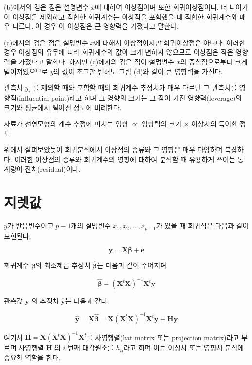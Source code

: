 \documentclass[
  10pt,
]{book}
\makeatletter
\newenvironment{kframe}{%
\medskip{}
\setlength{\fboxsep}{.8em}
 \def\at@end@of@kframe{}%
 \ifinner\ifhmode%
  \def\at@end@of@kframe{\end{minipage}}%
  \begin{minipage}{\columnwidth}%
 \fi\fi%
 \def\FrameCommand##1{\hskip\@totalleftmargin \hskip-\fboxsep
 \colorbox{shadecolor}{##1}\hskip-\fboxsep
     \hskip-\linewidth \hskip-\@totalleftmargin \hskip\columnwidth}%
 \MakeFramed {\advance\hsize-\width
   \@totalleftmargin\z@ \linewidth\hsize
   \@setminipage}}%
 {\par\unskip\endMakeFramed%
 \at@end@of@kframe}
\newenvironment{rmdblock}[1]
  {
  \begin{itemize}
  \renewcommand{\labelitemi}{
    \raisebox{-.7\height}[0pt][0pt]{
      {\setkeys{Gin}{width=3em,keepaspectratio}\texttt{[image: images/\#1]}}
    }
  }
  \setlength{\fboxsep}{1em}
  \begin{kframe}
  \item
  }
  {
  \end{kframe}
  \end{itemize}
  }
\newenvironment{rmdimportant}
  {\begin{rmdblock}{important}}
  {\end{rmdblock}}
\theoremstyle{definition}
\theoremstyle{definition}
\theoremstyle{definition}
\theoremstyle{definition}
\theoremstyle{remark}
\makeatother
\begin{document}
(b)에서의 검은 점은 설명변수 \(x\)에 대하여 이상점이며 또한
회귀이상점이다. 더 나아가 이 이상점을 제외하고 적합한 회귀계수는
이상점을 포함했을 때 적합한 회귀계수와 매우 다르다. 이 경우 이 이상점은
큰 영향력을 가졌다고 말한다.

(c)에서의 검은 점은 설명변수 \(x\)에 대해서 이상점이지만 회귀이상점은
아니다. 이러한 경우 이상점의 유무에 따라 회귀계수의 값이 크게 변하지
않으므로 이상점은 작은 영향력을 가졌다고 말한다. 하지만 (c)에서의 검은
점이 설명변수 \(x\)의 중심점으로부터 크게 멀어져있으므로 \(y\)의 값이 조그만
변해도 그림 (d)와 같이 큰 영향력을 가진다.

관측치 \(y_i\) 를 제외할 때와 포함할 때의 회귀계수 추정치가 매우 다르면 그
관측치를 영향점(influential point)라고 하며 그 영향의 크기는 그 점이
가진 영향력(leverage)의 크기와 평균에서 떨어진 정도에 비례한다.

\begin{rmdimportant}
자료가 선형모형의 계수 추정에 미치는 영향 \(\propto\) 영향력의 크기 \(\times\) 이상치의 특이한 정도
\end{rmdimportant}

위에서 살펴보았듯이 회귀분석에서 이상점의 종류와 그 영향은 매우 다양하며
복잡하다. 이러한 이상점의 종류와 회귀계수의 영향에 대하여 분석할 때
유용하게 쓰이는 통계량이 잔차(residual)이다.

\hypertarget{uxc9c0uxb81buxac12}{%
\section{지렛값}\label{uxc9c0uxb81buxac12}}

\(y\)가 반응변수이고 \(p-1\)개의 설명변수 \(x_1,x_2,\dots,x_{p-1}\)가 있을 때
회귀식은 다음과 같이 표현된다.

\[ \bm y = \bm X \bm \beta + \bm e \]

회귀계수 \(\bm \beta\)의 최소제곱 추정치 \(\hat{ \bm \beta}\)는 다음과 같이
주어지며

\[ \hat{ \bm \beta} = (\bm X^t \bm X)^{-1} \bm X^t \bm y \]

관측값 \(\bm y\) 의 추정치 \(\hat {\bm y}\)는 다음과 같다.

\[  \hat {\bm y} = \bm X \hat{ \bm \beta} =  \bm X (\bm X^t \bm X)^{-1} \bm X^t \bm y \equiv \bm H \bm y \]

여기서 \(\bm H= \bm X (\bm X^t \bm X)^{-1} \bm X^t\)를 사영행렬(hat matrix
또는 projection matrix)라고 부르며 사영행렬 \(\bm H\) 의 \(i\) 번째
대각원소를 \(h_{ii}\)라고 하며 이는 이상치 또는 영향치 분석에 중요한
역할을 한다.
\end{document}
